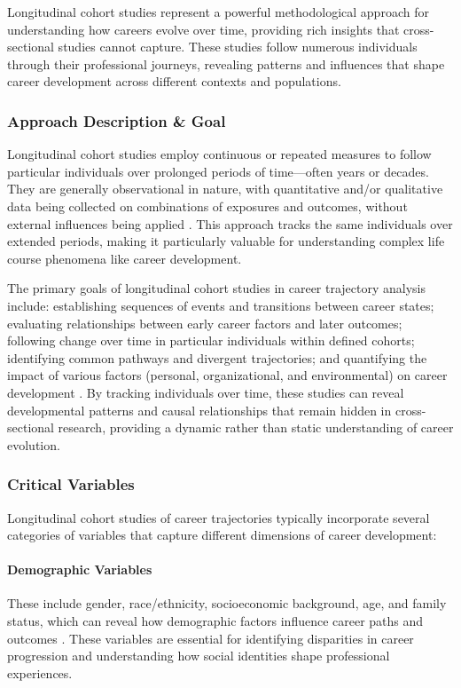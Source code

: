 \documentclass[../main.tex]{subfiles}
\begin{document}
Longitudinal cohort studies represent a powerful methodological approach for understanding how careers evolve over time, providing rich insights that cross-sectional studies cannot capture. These studies follow numerous individuals through their professional journeys, revealing patterns and influences that shape career development across different contexts and populations.

\subsubsection{Approach Description \& Goal}

Longitudinal cohort studies employ continuous or repeated measures to follow particular individuals over prolonged periods of time—often years or decades. They are generally observational in nature, with quantitative and/or qualitative data being collected on combinations of exposures and outcomes, without external influences being applied \parencite{caruana2015longitudinal}. This approach tracks the same individuals over extended periods, making it particularly valuable for understanding complex life course phenomena like career development.

The primary goals of longitudinal cohort studies in career trajectory analysis include: establishing sequences of events and transitions between career states; evaluating relationships between early career factors and later outcomes; following change over time in particular individuals within defined cohorts; identifying common pathways and divergent trajectories; and quantifying the impact of various factors (personal, organizational, and environmental) on career development \parencite{caruana2015longitudinal, porfeli2011career}. By tracking individuals over time, these studies can reveal developmental patterns and causal relationships that remain hidden in cross-sectional research, providing a dynamic rather than static understanding of career evolution.

\subsubsection{Critical Variables}

Longitudinal cohort studies of career trajectories typically incorporate several categories of variables that capture different dimensions of career development:

\paragraph{Demographic Variables}
These include gender, race/ethnicity, socioeconomic background, age, and family status, which can reveal how demographic factors influence career paths and outcomes \parencite{dol2021pathways, rios2021career}. These variables are essential for identifying disparities in career progression and understanding how social identities shape professional experiences.
\end{document}
